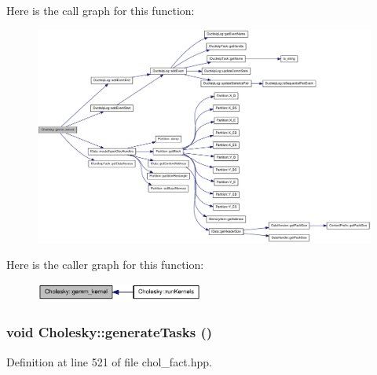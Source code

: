 Here is the call graph for this function:\nopagebreak
\begin{figure}[H]
\begin{center}
\leavevmode
\includegraphics[width=420pt]{class_cholesky_a8891a656d18c8e11e8e26447cebc9348_cgraph}
\end{center}
\end{figure}


Here is the caller graph for this function:\nopagebreak
\begin{figure}[H]
\begin{center}
\leavevmode
\includegraphics[width=156pt]{class_cholesky_a8891a656d18c8e11e8e26447cebc9348_icgraph}
\end{center}
\end{figure}
\hypertarget{class_cholesky_adadbc20c3a9481c909c8143985fbf0e1}{
\subsubsection[{generateTasks}]{\setlength{\rightskip}{0pt plus 5cm}void Cholesky::generateTasks ()}}
\label{class_cholesky_adadbc20c3a9481c909c8143985fbf0e1}


Definition at line 521 of file chol\_\-fact.hpp.

